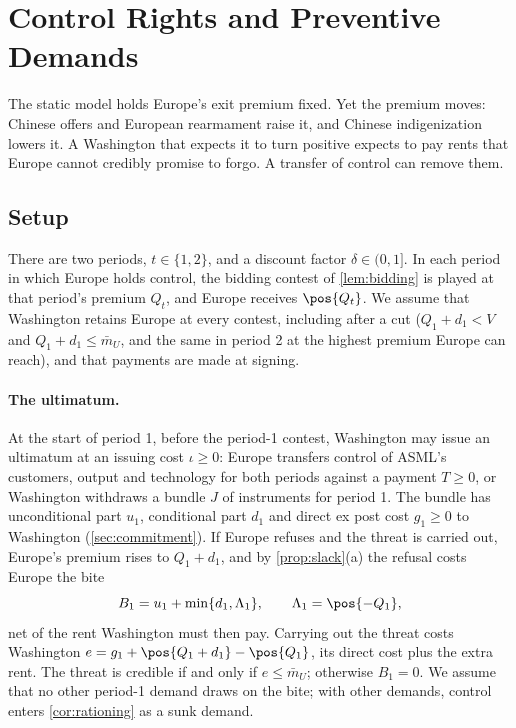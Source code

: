 \section{Control Rights and Preventive Demands}\label{sec:control}

The static model holds Europe's exit premium fixed. Yet the premium moves: Chinese offers and European rearmament raise it, and Chinese indigenization lowers it. A Washington that expects it to turn positive expects to pay rents that Europe cannot credibly promise to forgo. A transfer of control can remove them.

\subsection{Setup}\label{sec:controlsetup}

There are two periods, $t\in\{1,2\}$, and a discount factor $\delta\in(0,1]$. In each period in which Europe holds control, the bidding contest of \cref{lem:bidding} is played at that period's premium $Q_t$, and Europe receives $\pos{Q_t}$. We assume that Washington retains Europe at every contest, including after a cut ($Q_1+d_1<V$ and $Q_1+d_1\le\bar m_U$, and the same in period 2 at the highest premium Europe can reach), and that payments are made at signing.

\paragraph{The ultimatum.} At the start of period 1, before the period-1 contest, Washington may issue an ultimatum at an issuing cost $\iota\ge 0$: Europe transfers control of ASML's customers, output and technology for both periods against a payment $T\ge 0$, or Washington withdraws a bundle $J$ of instruments for period 1. The bundle has unconditional part $u_1$, conditional part $d_1$ and direct ex post cost $g_1\ge 0$ to Washington (\cref{sec:commitment}). If Europe refuses and the threat is carried out, Europe's premium rises to $Q_1+d_1$, and by \cref{prop:slack}(a) the refusal costs Europe the bite
\[
B_1=u_1+\min\{d_1,\Lambda_1\},\qquad \Lambda_1=\pos{-Q_1},
\]
net of the rent Washington must then pay. Carrying out the threat costs Washington $e=g_1+\pos{Q_1+d_1}-\pos{Q_1}$, its direct cost plus the extra rent. The threat is credible if and only if $e\le\bar m_U$; otherwise $B_1=0$. We assume that no other period-1 demand draws on the bite; with other demands, control enters \cref{cor:rationing} as a sunk demand.

